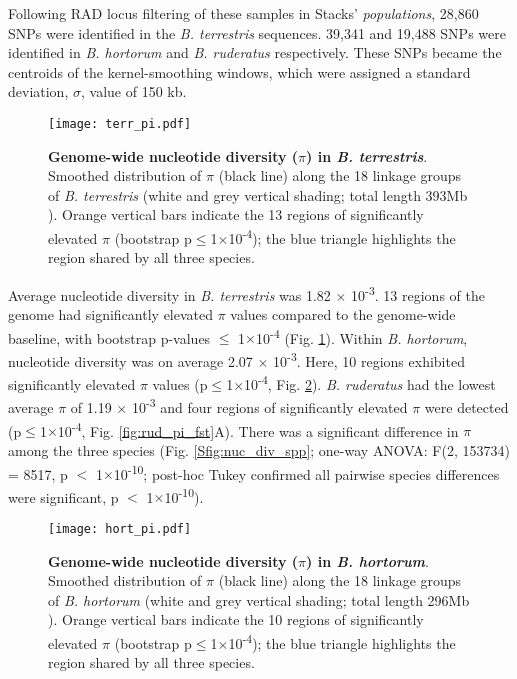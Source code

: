 \documentclass[12pt]{article}
\begin{document}
\begin{linenumbers}
	Following RAD locus filtering of these samples in Stacks' \emph{populations}, 28,860 SNPs were identified in the \emph{B. terrestris} sequences. 39,341 and 19,488 SNPs were identified in \emph{B. hortorum} and \emph{B. ruderatus} respectively. These SNPs became the centroids of the kernel-smoothing windows, which were assigned a standard deviation, $\sigma$, value of 150 kb.
  		
  	\begin{figure}[ht!]
  			\centering
  			\texttt{[image: terr\_pi.pdf]}
  			\captionsetup{width=0.88\linewidth}
  			\caption{\textbf{Genome-wide nucleotide diversity ($\pi$) in \emph{B. terrestris}}. Smoothed distribution of $\pi$ (black line) along the 18 linkage groups of \emph{B. terrestris} (white and grey vertical shading; total length 393Mb  \citep{ncbi_iybomterr12_2022}). Orange vertical bars indicate the 13 regions of significantly elevated $\pi$ (bootstrap p$\leq$1$\times$10\textsuperscript{-4}); the blue triangle highlights the region shared by all three species.}
  			\label{fig:terr_pi}
  	\end{figure}
  	
    Average nucleotide diversity in \emph{B. terrestris} was 1.82 $\times$ 10\textsuperscript{-3}. 13 regions of the genome had significantly elevated $\pi$ values compared to the genome-wide baseline, with bootstrap p-values $\leq$ 1$\times$10\textsuperscript{-4} (Fig. \ref{fig:terr_pi}). 
    Within \emph{B. hortorum}, nucleotide diversity was on average 2.07 $\times$ 10\textsuperscript{-3}. Here, 10 regions exhibited significantly elevated $\pi$ values (p$\leq$1$\times$10\textsuperscript{-4}, Fig. \ref{fig:hort_pi}). 
    \emph{B. ruderatus} had the lowest average $\pi$ of 1.19 $\times$ 10\textsuperscript{-3} and four regions of significantly elevated $\pi$ were detected (p$\leq$1$\times$10\textsuperscript{-4}, Fig. \ref{fig:rud_pi_fst}A).
    There was a significant difference in $\pi$ among the three species (Fig. \ref{Sfig:nuc_div_spp}; one-way ANOVA: F(2, 153734) = 8517, p $<$ 1$\times$10\textsuperscript{-10}; post-hoc Tukey confirmed all pairwise species differences were significant, p $<$ 1$\times$10\textsuperscript{-10}). 
    
	\begin{figure}[ht!]
		\centering
		\texttt{[image: hort\_pi.pdf]}
		\captionsetup{width=0.88\linewidth}
		\caption{\textbf{Genome-wide nucleotide diversity ($\pi$) in \emph{B. hortorum}}. Smoothed distribution of $\pi$ (black line) along the 18 linkage groups of \emph{B. hortorum} (white and grey vertical shading; total length 296Mb \citep{ncbi_iybomhort11_2021}). Orange vertical bars indicate the 10 regions of significantly elevated $\pi$ (bootstrap p$\leq$1$\times$10\textsuperscript{-4}); the blue triangle highlights the region shared by all three species.}
		\label{fig:hort_pi}
	\end{figure}


\end{linenumbers}
\end{document}
